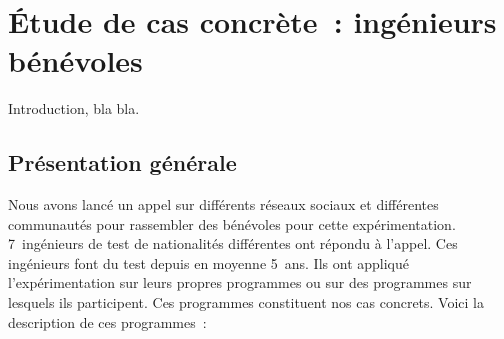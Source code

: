 \section{Étude de cas concrète~: ingénieurs bénévoles}
\label{section:experimentation:real}

Introduction, bla bla.

\subsection{Présentation générale}

Nous avons lancé un appel sur différents réseaux sociaux et différentes
communautés pour rassembler des bénévoles pour cette expérimentation.
7~ingénieurs de test de nationalités différentes ont répondu à l'appel. Ces
ingénieurs font du test depuis en moyenne 5~ans. Ils ont appliqué
l'expérimentation sur leurs propres programmes ou sur des programmes sur
lesquels ils participent. Ces programmes constituent nos cas concrets. Voici la
description de ces programmes~:
%
